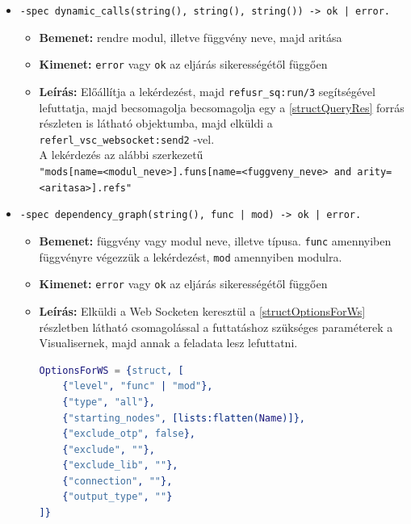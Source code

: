 \begin{itemize}
    \item \lstinline{-spec dynamic_calls(string(), string(), string()) -> ok | error.}
    \begin{itemize}
        \item \textbf{Bemenet:} rendre modul, illetve függvény neve, majd aritása
        \item \textbf{Kimenet:} \lstinline{error} vagy \lstinline{ok} az eljárás sikerességétől függően
        \item \textbf{Leírás:} Előállítja a lekérdezést, majd \lstinline{refusr_sq:run/3} segítségével lefuttatja, majd becsomagolja becsomagolja egy a \ref{structQueryRes} forrás részleten is látható objektumba, majd elküldi a \lstinline{referl_vsc_websocket:send2} -vel. \\
        A lekérdezés az alábbi szerkezetű \\ 
        \lstinline{"mods[name=<modul_neve>].funs[name=<fuggveny_neve> and arity=<aritasa>].refs"}
    \end{itemize}
    
    
    \item \lstinline{-spec dependency_graph(string(), func | mod) -> ok | error.}
    \begin{itemize}
        \item \textbf{Bemenet:} függvény vagy modul neve, illetve típusa. \lstinline{func} amennyiben függvényre végezzük a lekérdezést, \lstinline{mod} amennyiben modulra.
        \item \textbf{Kimenet:} \lstinline{error} vagy \lstinline{ok} az eljárás sikerességétől függően
        \item \textbf{Leírás:} Elküldi a Web Socketen keresztül a \ref{structOptionsForWs} részletben látható csomagolással a futtatáshoz szükséges paraméterek a Visualisernek, majd annak a feladata lesz lefuttatni. \\
\lstset{caption=Web Socketen keresztül küldött opciók, label=src:erlang}  \label{structOptionsForWs}
\begin{lstlisting}[language={erlang}] 
OptionsForWS = {struct, [
    {"level", "func" | "mod"},
    {"type", "all"},
    {"starting_nodes", [lists:flatten(Name)]},
    {"exclude_otp", false},
    {"exclude", ""},
    {"exclude_lib", ""},
    {"connection", ""},
    {"output_type", ""}
]}
\end{lstlisting}
    \end{itemize}
    
   
\end{itemize}





